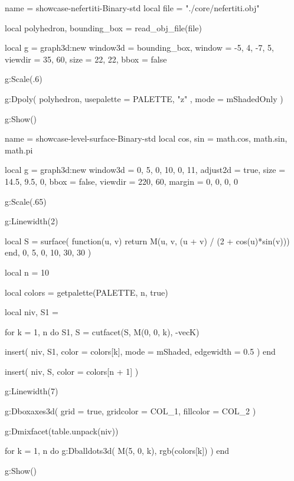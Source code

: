 \documentclass{tutodoc}
\newcommand{\PALETTE}{Binary}
\begin{document}

\vfill

\begin{luadraw}{name = showcase-nefertiti-\PALETTE-std}
local file = "./core/nefertiti.obj"

local polyhedron, bounding_box = read_obj_file(file)

local g = graph3d:new{
  window3d = bounding_box,
  window   = {-5, 4, -7, 5},
  viewdir  = {35, 60},
  size     = {22, 22},
  bbox     = false
}

g:Scale(.6)

g:Dpoly(
  polyhedron,
  {
    usepalette = {PALETTE, "z" },
    mode       = mShadedOnly
  }
)

g:Show()
\end{luadraw}



\vfill

\begin{luadraw}{name = showcase-level-surface-\PALETTE-std}
local cos, sin = math.cos, math.sin, math.pi

local g = graph3d:new{
  window3d = {0, 5, 0, 10, 0, 11},
  adjust2d = true,
  size     = {14.5, 9.5, 0},
  bbox     = false,
  viewdir  = {220, 60},
  margin   = {0, 0, 0, 0}
}

g:Scale(.65)

g:Linewidth(2)

local S = surface(
  function(u, v)
    return M(u, v, (u  +  v) / (2  +  cos(u)*sin(v)))
  end,
  0, 5, 0, 10,
  {30, 30}
)

local n = 10

local colors = getpalette(PALETTE, n, true)

local niv, S1 = {}

for k = 1, n do
  S1, S = cutfacet(S, {M(0, 0, k), -vecK})

  insert(
    niv,
    {
      S1,
      {
        color     = colors[k],
        mode      = mShaded,
        edgewidth = 0.5
      }
    }
  )
end

insert(
  niv,
  {
    S,
    {color = colors[n  +  1]}
  }
)

g:Linewidth(7)

g:Dboxaxes3d({
  grid      = true,
  gridcolor = COL_1,
  fillcolor = COL_2
})

g:Dmixfacet(table.unpack(niv))

for k = 1, n do
  g:Dballdots3d(
    M(5, 0, k),
    rgb(colors[k])
  )
end

g:Show()
\end{luadraw}
\end{document}

